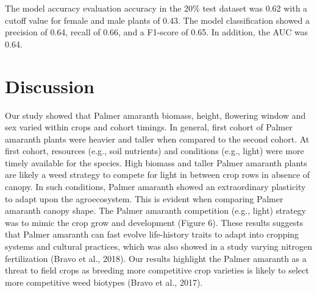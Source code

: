 \documentclass[utf8]{frontiersSCNS}
\begin{document}
The model accuracy evaluation accuracy in the 20\% test dataset was 0.62
with a cutoff value for female and male plants of 0.43. The model
classification showed a precision of 0.64, recall of 0.66, and a
F1-score of 0.65. In addition, the AUC was 0.64.

\hypertarget{discussion}{%
\section*{Discussion}\label{discussion}}

Our study showed that Palmer amaranth biomass, height, flowering window
and sex varied within crops and cohort timings. In general, first cohort
of Palmer amaranth plants were heavier and taller when compared to the
second cohort. At first cohort, resources (e.g., soil nutrients) and
conditions (e.g., light) were more timely available for the species.
High biomass and taller Palmer amaranth plants are likely a weed
strategy to compete for light in between crop rows in absence of canopy.
In such conditions, Palmer amaranth showed an extraordinary plasticity
to adapt upon the agroecosystem. This is evident when comparing Palmer
amaranth canopy shape. The Palmer amaranth competition (e.g., light)
strategy was to mimic the crop grow and development (Figure 6). These
results suggests that Palmer amaranth can fast evolve life-history
traits to adapt into cropping systems and cultural practices, which was
also showed in a study varying nitrogen fertilization (Bravo et al.,
2018). Our results highlight the Palmer amaranth as a threat to field
crops as breeding more competitive crop varieties is likely to select
more competitive weed biotypes (Bravo et al., 2017).
\end{document}
